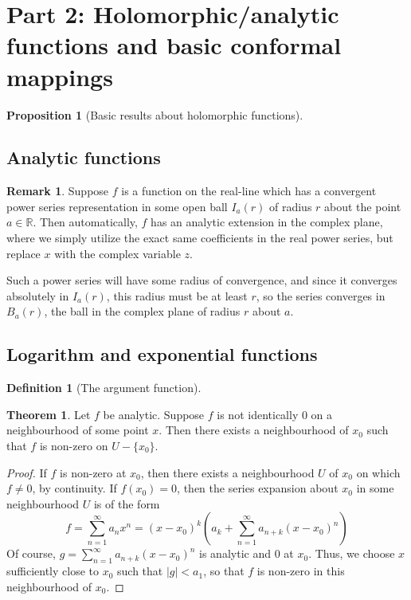 \documentclass[aps,pra,showpacs,notitlepage,onecolumn,superscriptaddress,nofootinbib]{revtex4-1}
\theoremstyle{definition}
\newtheorem{definition}{Definition}[section]
\newtheorem{theorem}{Theorem}[section]
\newtheorem{remark}{Remark}[section]
\newtheorem{proposition}{Proposition}[section]
\begin{document}
\noindent 

\section{Part 2: Holomorphic/analytic functions and basic conformal mappings}

\begin{proposition}[Basic results about holomorphic functions]
\end{proposition}

\subsection{Analytic functions}

\begin{remark}
  Suppose $f$ is a function on the real-line which has a convergent power series representation in some open ball $I_a(r)$ of radius $r$ about the point $a \in \mathbb{R}$.
  Then automatically, $f$ has an analytic extension in the complex plane, where we simply utilize the exact same coefficients in the real power series, but replace $x$
  with the complex variable $z$.

  Such a power series will have some radius of convergence, and since it converges absolutely in $I_a(r)$, this radius must be at least $r$, so the series converges
  in $B_a(r)$, the ball in the complex plane of radius $r$ about $a$.
\end{remark}

\subsection{Logarithm and exponential functions}

\begin{definition}[The argument function]
\end{definition}

\begin{theorem}
  Let $f$ be analytic. Suppose $f$ is not identically $0$ on a neighbourhood of some point $x$. Then there exists a neighbourhood of $x_0$
  such that $f$ is non-zero on $U - \{x_0\}$. 
\end{theorem}
\begin{proof}
  If $f$ is non-zero at $x_0$, then there exists a neighbourhood $U$ of $x_0$ on which $f \neq 0$, by continuity. If $f(x_0) = 0$, then the series expansion
  about $x_0$ in some neighbourhood $U$ is of the form
  \begin{equation}
    f = \displaystyle\sum_{n = 1}^{\infty} a_n x^n = (x - x_0)^k \left( a_k + \displaystyle\sum_{n = 1}^{\infty} a_{n + k} (x - x_0)^{n} \right)
  \end{equation}
  Of course, $g = \displaystyle\sum_{n = 1}^{\infty} a_{n + k} (x - x_0)^{n}$ is analytic and $0$ at $x_0$. Thus, we choose $x$ sufficiently close to $x_0$ such that $|g| < a_1$, so
  that $f$ is non-zero in this neighbourhood of $x_0$.
  \end{proof}
\end{document}
